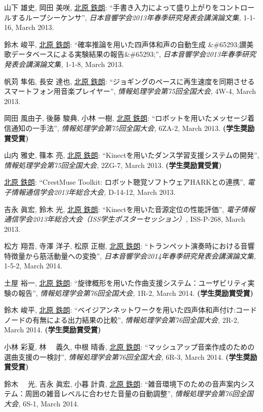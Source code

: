 \begin{Enumerate}
\item 
山下 雄史, 
岡田 美咲, 
\underline{北原 鉄朗}: 
    ``手書き入力によって盛り上がりをコントロールするループシーケンサ'', 
    {\it 日本音響学会2013年春季研究発表会講演論文集,
    } 1-1-16, March 2013. 

\item 
鈴木 峻平, 
\underline{北原 鉄朗}: 
    ``確率推論を用いた四声体和声の自動生成 \&\#65293;讃美歌データベースによる実験結果の報告\&\#65293;'', 
    {\it 日本音響学会2013年春季研究発表会講演論文集,
    } 1-1-8, March 2013. 

\item 
帆苅 隼佑, 
長安 達也, 
\underline{北原 鉄朗}: 
    ``ジョギングのペースに再生速度を同期させるスマートフォン用音楽プレイヤー'', 
    {\it 情報処理学会第75回全国大会,
    } 4W-4, March 2013. 

\item 
岡田 風由子, 
後藤 駿典, 
小林 一樹, 
\underline{北原 鉄朗}: 
    ``ロボットを用いたメッセージ着信通知の一手法'', 
    {\it 情報処理学会第75回全国大会,
    } 6ZA-2, March 2013. 
{\bf (学生奨励賞受賞)}
\item 
山内 雅史, 
篠本 亮, 
\underline{北原 鉄朗}: 
    ``Kinectを用いたダンス学習支援システムの開発'', 
    {\it 情報処理学会第75回全国大会,
    } 2ZG-7, March 2013. 
{\bf (学生奨励賞受賞)}
\item 
\underline{北原 鉄朗}: 
    ``CrestMuse Toolkit: ロボット聴覚ソフトウェアHARKとの連携'', 
    {\it 電子情報通信学会2013年総合大会,
    } D-14-12, March 2013. 

\item 
吉永 眞宏, 
鈴木 光, 
\underline{北原 鉄朗}: 
    ``Kinectを用いた音源定位の性能評価'', 
    {\it 電子情報通信学会2013年総合大会（ISS学生ポスターセッション）,
    } ISS-P-268, March 2013. 

\item 
松方 翔吾, 
寺澤 洋子, 
松原 正樹, 
\underline{北原 鉄朗}: 
    ``トランペット演奏時における音響特徴量から筋活動量への変換'', 
    {\it 日本音響学会2014年春季研究発表会講演論文集,
    } 1-5-2, March 2014. 

\item 
土屋 裕一, 
\underline{北原 鉄朗}: 
    ``旋律概形を用いた作曲支援システム：ユーザビリティ実験の報告'', 
    {\it 情報処理学会第76回全国大会,
    } 1R-2, March 2014. 
{\bf (学生奨励賞受賞)}
\item 
鈴木 峻平, 
\underline{北原 鉄朗}: 
    ``ベイジアンネットワークを用いた四声体和声付け:コードノードの有無による出力結果の比較'', 
    {\it 情報処理学会第76回全国大会,
    } 2R-2, March 2014. 
{\bf (学生奨励賞受賞)}
\item 
小林 彩夏, 
林　 義久, 
中根 晴香, 
\underline{北原 鉄朗}: 
    ``マッシュアップ音楽作成のための選曲支援の一検討'', 
    {\it 情報処理学会第76回全国大会,
    } 6R-3, March 2014. 
{\bf (学生奨励賞受賞)}
\item 
鈴木 　光, 
吉永 眞宏, 
小暮 計貴, 
\underline{北原 鉄朗}: 
    ``雑音環境下のための音声案内システム：周囲の雑音レベルに合わせた音量の自動調整'', 
    {\it 情報処理学会第76回全国大会,
    } 6S-1, March 2014. 


\end{Enumerate}
